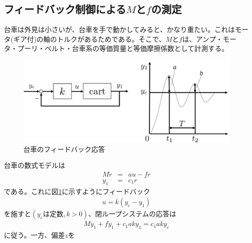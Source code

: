 \documentclass[a4j,11pt,twoside]{ujbook}
\begin{document}
\subsection{フィードバック制御による$M$と$f$の測定}
台車は外見は小さいが、台車を手で動かしてみると、かなり重たい。これはモータ(ギア付)の軸のトルクがあるためである。そこで、$M$と$f$は、アンプ・モータ・プーリ・ベルト・台車系の等価質量と等価摩擦係数として計測する。

\begin{figure}[htbp]
	\begin{center}
		\includegraphics[width = 1.0 \linewidth]{feedback.eps}
		\caption{台車のフィードバック応答}
		\label{fig:台車のフィードバック応答}
	\end{center}
\end{figure}

台車の数式モデルは
\begin{eqnarray}
	M\ddot{r} & = & au - fr \\
	y_1 & = & c_1r
\end{eqnarray}
である。これに図\ref{fig:台車のフィードバック応答}に示すようにフィードバック
\begin{eqnarray}
	u = k(y_c - y_1)
\end{eqnarray}
を施すと$(y_cは定数,k>0)$、閉ループシステムの応答は
\begin{eqnarray}
	M\ddot{y}_1 + f\dot{y}_1 + c_1aky_1 = c_1aky_c
\end{eqnarray}
に従う。一方、偏差$z$を
\end{document}
